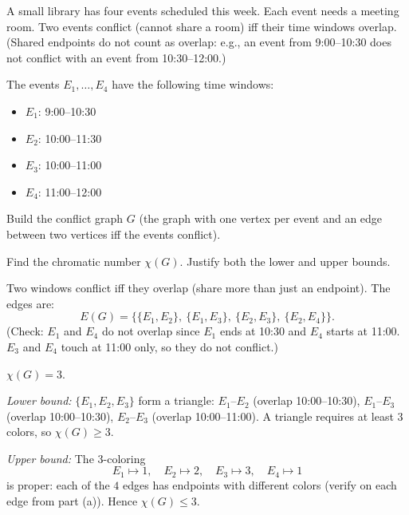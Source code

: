 \documentclass[test,letterpaper]{cs20}
\begin{document}
\begin{problem}

A small library has four events scheduled this week. Each event needs a meeting room. Two events conflict (cannot share a room) iff their time windows overlap.
(Shared endpoints do not count as overlap: e.g., an event from 9:00--10:30 does not conflict with an event from 10:30--12:00.)

\bigskip
The events $E_1,\ldots,E_4$ have the following time windows:
\begin{itemize}
\item $E_1$: 9:00--10:30
\item $E_2$: 10:00--11:30
\item $E_3$: 10:00--11:00
\item $E_4$: 11:00--12:00
\end{itemize}

\subproblem Build the conflict graph $G$ (the graph with one vertex per event and an edge between two vertices iff the events conflict).

\subproblem Find the chromatic number $\chi(G)$. Justify both the lower and upper bounds.

\begin{solution}
\subsolution Two windows conflict iff they overlap (share more than just an endpoint). The edges are:
\[
E(G) = \{ \{E_1,E_2\},\ \{E_1,E_3\},\ \{E_2,E_3\},\ \{E_2,E_4\}\}.
\]
(Check: $E_1$ and $E_4$ do not overlap since $E_1$ ends at 10:30 and $E_4$ starts at 11:00. $E_3$ and $E_4$ touch at 11:00 only, so they do not conflict.)

\subsolution $\chi(G) = 3$.

\emph{Lower bound:} $\{E_1,E_2,E_3\}$ form a triangle: $E_1$--$E_2$ (overlap 10:00--10:30), $E_1$--$E_3$ (overlap 10:00--10:30), $E_2$--$E_3$ (overlap 10:00--11:00). A triangle requires at least $3$ colors, so $\chi(G) \ge 3$.

\emph{Upper bound:} The $3$-coloring
\[
E_1 \mapsto 1,\quad E_2 \mapsto 2,\quad E_3 \mapsto 3,\quad E_4 \mapsto 1
\]
is proper: each of the $4$ edges has endpoints with different colors (verify on each edge from part (a)). Hence $\chi(G) \le 3$.
\end{solution}

\pagebreak

\end{problem}
\end{document}
